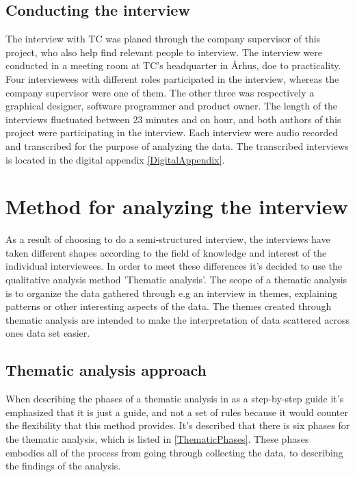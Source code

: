 \subsection{Conducting the interview}
\label{ConductingInterview}
%
The interview with TC was planed through the company supervisor of this project, who also help find relevant people to interview. The interview were conducted in a meeting room at TC's headquarter in Århus, doe to practicality.\\
Four interviewees with different roles participated in the interview, whereas the company supervisor were one of them. The other three was respectively a graphical designer, software programmer and product owner. The length of the interviews fluctuated between 23 minutes and on hour, and both authors of this project were participating in the interview. Each interview were audio recorded and transcribed for the purpose of analyzing the data. The transcribed interviews is located in the digital appendix \autoref{DigitalAppendix}.\\


\section{Method for analyzing the interview}
\label{InterviewAnalysis}
%
As a result of choosing to do a semi-structured interview, the interviews have taken different shapes according to the field of knowledge and interest of the individual interviewees. In order to meet these differences it's decided to use the qualitative analysis method 'Thematic analysis'. The scope of a thematic analysis is to organize the data gathered through e.g an interview in themes, explaining patterns or other interesting aspects of the data\parencite{PDF:Braun2006}. The themes created through thematic analysis are intended to make the interpretation of data scattered across ones data set easier. 

\subsection{Thematic analysis approach}
\label{ThematicAnalysisApproach}
When describing the phases of a thematic analysis in \parencite[86]{PDF:Braun2006} as a step-by-step guide it's emphasized that it is just a guide, and not a set of rules because it would counter the flexibility that this method provides. It's described that there is six phases for the thematic analysis, which is listed in \autoref{ThematicPhases}. These phases embodies all of the process from going through collecting the data, to describing the findings of the analysis.

